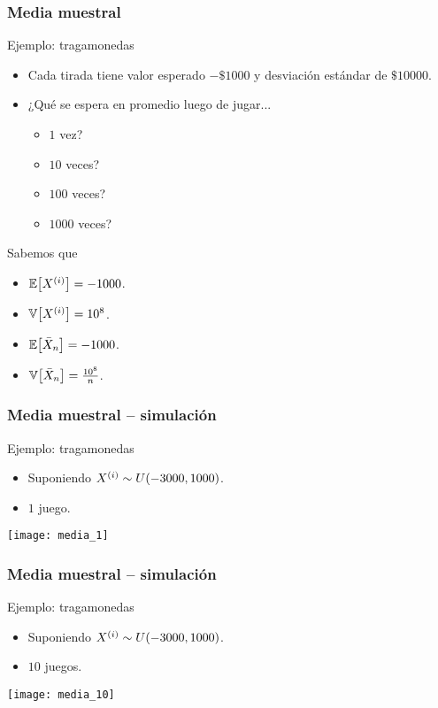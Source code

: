 \documentclass[table]{beamer}
\begin{document}
\begin{frame}
    \frametitle{Media muestral}
    \begin{block}{Ejemplo: tragamonedas}
        \begin{itemize}
            \item Cada tirada tiene valor esperado $- \$ 1000$ y desviación estándar de $\$ 10000$.
            \item ¿Qué se espera en promedio luego de jugar...
                \begin{itemize}
                    \item $1$ vez?
                    \item $10$ veces?
                    \item $100$ veces?
                    \item $1000$ veces?
                \end{itemize}
        \end{itemize}
    \end{block}
    \begin{block}{Sabemos que}
        \begin{itemize}
            \item $\expected{X^{\parens{i}}} = - 1000$.
            \item $\variance{X^{\parens{i}}} = 10^{8}$.
            \item $\expected{\bar{X}_{n}} = - 1000$.
            \item $\variance{\bar{X}_{n}} = \frac{10^{8}}{n}$.
        \end{itemize}
    \end{block}
\end{frame}

\begin{frame}
    \frametitle{Media muestral -- simulación}
    \begin{block}{Ejemplo: tragamonedas}
        \begin{itemize}
            \item Suponiendo $X^{\parens{i}} \sim \uniform{- 3000}{1000}$.
            \item $1$ juego.
        \end{itemize}
    \end{block}
    \begin{center}
        \texttt{[image: media\_1]}
    \end{center}
\end{frame}

\begin{frame}
    \frametitle{Media muestral -- simulación}
    \begin{block}{Ejemplo: tragamonedas}
        \begin{itemize}
            \item Suponiendo $X^{\parens{i}} \sim \uniform{- 3000}{1000}$.
            \item $10$ juegos.
        \end{itemize}
    \end{block}
    \begin{center}
        \texttt{[image: media\_10]}
    \end{center}
\end{frame}
\end{document}
